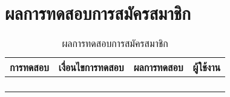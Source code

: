 \section{ผลการทดสอบการสมัครสมาชิก}
\begin{table}[H]
	\caption{ผลการทดสอบการสมัครสมาชิก}
    \centering	
	\label{tab:test2}
    \begin{tabular}{ | p{4cm} | p{4cm} | p{4cm} | p{2cm} | }
    \hline
	\multicolumn{1}{|c|}{การทดสอบ} & \multicolumn{1}{c|}{เงื่อนไขการทดสอบ} & \multicolumn{1}{c|}{ผลการทดสอบ} & \multicolumn{1}{c|}{ผู้ใช้งาน}                             \\ \hline
	\setstretch{1.0}{ทดสอบการสมัครสมาชิก}
	& \setstretch{1.0}{ผู้ใช้งานเข้ามาในหน้าสมัครสมาชิก}
	& \setstretch{1.0}{ระบบแสดงหน้าสมัครสมาชิก} 
	&\setstretch{1.0}{\begin{flushleft}ผู้ใช้งาน\end{flushleft}} \\ \cline{2-3} 
	& \setstretch{1.0}{ผู้ใช้ไม่หรอกข้อมูลชื่อและรหัสผ่าน} 
	& \setstretch{1.0}{ระบบจะแสดงข้อความว่า “ชื่อผู้ใช้หรือรหัสผ่านไม่ถูกต้อง”} 
	&\setstretch{1.0}{}\\ \cline{2-3} 
	& \setstretch{1.0}{ผู้ใช้กดปุ่มสมัครสมาชิกโดยกรอกชื่อซ้ำกับชื่อที่มีอยู่ในระบบ}  
	& \setstretch{1.0}{ระบบจะแสดงข้อความว่า “ชื่อผู้ใช้หรือรหัสผ่านไม่ถูกต้อง”} 
	&\setstretch{1.0}{}\\ \cline{2-3} 
	& \setstretch{1.0}{ผู้ใช้กดปุ่มสมัครสมาชิกโดยกรอกชื่อไม่ซ้ำกับชื่อที่มีอยู่ในระบบ} 
	& \setstretch{1.0}{มีข้อความแสดงบอกผู้ใช้ว่า “สมัครสมาชิกสำเร็จ”} 
	&\setstretch{1.0}{}\\ \cline{2-3} \hline
    \end{tabular}
\end{table}

